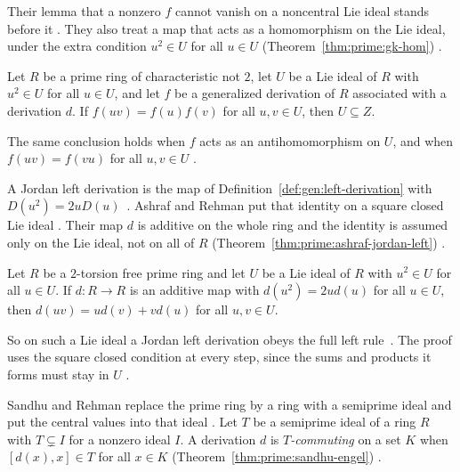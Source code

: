 Their lemma that a nonzero $f$ cannot vanish on a noncentral Lie ideal stands
before it \cite[Lemma~5, p.~863]{GolbasiKaya2006}. They also treat a map that
acts as a homomorphism on the Lie ideal, under the extra condition $u^{2}\in
U$ for all $u\in U$ (Theorem~\ref{thm:prime:gk-hom})
\cite[p.~864]{GolbasiKaya2006}.

\begin{theorem}\label{thm:prime:gk-hom}
Let $R$ be a prime ring of characteristic not $2$, let $U$ be a Lie ideal of $R$
with $u^{2}\in U$ for all $u\in U$, and let $f$ be a generalized derivation of $R$
associated with a derivation $d$. If $f(uv)=f(u)f(v)$ for all $u,v\in U$, then
$U\subseteq Z$.
\end{theorem}

The same conclusion holds when $f$ acts as an antihomomorphism on $U$, and
when $f(uv)=f(vu)$ for all $u,v\in U$ \cite[Theorems~3 and~4,
p.~864]{GolbasiKaya2006}.

A Jordan left derivation is the map of
Definition~\ref{def:gen:left-derivation} with $D(u^{2})=2uD(u)$~\cite[p.~205]{AshrafRehman2000}. Ashraf and
Rehman put that identity on a square closed Lie ideal
\cite[p.~200]{AshrafRehman2000}. Their map $d$ is additive on the whole ring and
the identity is assumed only on the Lie ideal, not on all of $R$ (Theorem~\ref{thm:prime:ashraf-jordan-left})
\cite[p.~205]{AshrafRehman2000}.\begin{theorem}\label{thm:prime:ashraf-jordan-left}
Let $R$ be a $2$-torsion free prime ring and let $U$ be a Lie ideal of $R$ with
$u^{2}\in U$ for all $u\in U$. If $d\colon R\to R$ is an additive map with
$d(u^{2})=2ud(u)$ for all $u\in U$, then $d(uv)=ud(v)+vd(u)$ for all $u,v\in U$.
\end{theorem}

So on such a Lie ideal a Jordan left derivation obeys the full left rule~\cite[p.~205]{AshrafRehman2000}. The
proof uses the square closed condition at every step, since the sums and
products it forms must stay in $U$ \cite[p.~205]{AshrafRehman2000}.

Sandhu and Rehman replace the prime ring by a ring with a semiprime ideal and
put the central values into that ideal \cite[p.~1]{SandhuRehman2025}. Let $T$
be a semiprime ideal of a ring $R$ with $T\subsetneq I$ for a nonzero ideal
$I$. A derivation $d$ is \emph{$T$-commuting} on a set $K$ when $[d(x),x]\in
T$ for all $x\in K$ (Theorem~\ref{thm:prime:sandhu-engel})
\cite[p.~1]{SandhuRehman2025}.

